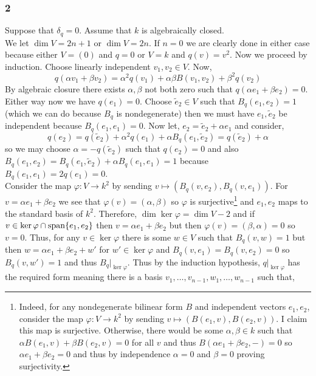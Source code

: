 \documentclass[12pt]{article}
\begin{document}
\subsubsection{2}

Suppose that $\delta_q = 0$. Assume that $k$ is algebraically closed.
\bigskip\\
We let $\dim{V} = 2n + 1$ or $\dim{V} = 2n$. If $n = 0$ we are clearly done in either case because either $V = (0)$ and $q = 0$ or $V = k$ and $q(v) = v^2$. Now we proceed by induction. Choose linearly independent $v_1, v_2 \in V$. Now,
\[ q(\alpha v_1 + \beta v_2) = \alpha^2 q(v_1) + \alpha \beta B(v_1, v_2) + \beta^2 q(v_2) \]
By algebraic closure there exists $\alpha, \beta$ not both zero such that $q(\alpha e_1 + \beta e_2) = 0$. 
\bigskip\\
Either way now we have $q(e_1) = 0$. Choose $\tilde{e}_2 \in V$ such that $B_q(e_1, e_2) = 1$ (which we can do because $B_q$ is nondegenerate) then we must have $e_1, \tilde{e}_2$ be independent because $B_q(e_1, e_1) = 0$. Now let, $e_2 = \tilde{e}_2 + \alpha e_1$
and consider,
\[ q(e_2) = q(\tilde{e}_2) + \alpha^2 q(e_1) + \alpha B_q(e_1, \tilde{e}_2) = q(\tilde{e}_2) + \alpha \]
so we may choose $\alpha = - q(\tilde{e}_2)$ such that $q(e_2) = 0$ and also $B_q(e_1, e_2) = B_q(e_1, \tilde{e}_2) + \alpha B_q(e_1, e_1) = 1$ because $B_q(e_1, e_1) = 2 q(e_1) = 0$. 
\bigskip\\
Consider the map $\varphi : V \to k^2$ by sending $v \mapsto (B_q(v, e_2), B_q(v, e_1))$. For $v = \alpha e_1 + \beta e_2$ we see that $\varphi(v) = (\alpha, \beta)$ so $\varphi$ is surjective\footnote{Indeed, for any nondegenerate bilinear form $B$ and independent vectors $e_1, e_2$, consider the map $\varphi : V \to k^2$ by sending $v \mapsto (B(e_1, v), B(e_2, v))$. I claim this map is surjective. Otherwise, there would be some $\alpha, \beta \in k$ such that $\alpha B(e_1, v) + \beta B(e_2, v) = 0$ for all $v$ and thus $B(\alpha e_1 + \beta e_2, -) = 0$ so $\alpha e_1 + \beta e_2 = 0$ and thus by independence $\alpha = 0$ and $\beta = 0$ proving surjectivity.} and $e_1, e_2$ maps to the standard basis of $k^2$. Therefore, $\dim{\ker{\varphi}} = \dim{V} - 2$ and if $v \in \ker{\varphi} \cap \mathrm{span}\! \left\{e_1, e_2 \right\}$ then $v = \alpha e_1 + \beta e_2$ but then $\varphi(v) = (\beta, \alpha) = 0$ so $v = 0$. Thus, for any $v \in \ker{\varphi}$ there is some $w \in V$ such that $B_q(v, w) = 1$ but then $w = \alpha e_1 + \beta e_2 + w'$ for $w' \in \ker{\varphi}$ and $B_q(v, e_1) = B_q(v, e_2) = 0$ so $B_q(v, w') = 1$ and thus $B_q |_{\ker{\varphi}}$. Thus by the induction hypothesis, $q |_{\ker{\varphi}}$ has the required form meaning there is a basis $v_1, \dots, v_{n-1}, w_1, \dots, w_{n-1}$ such that,
\end{document}
